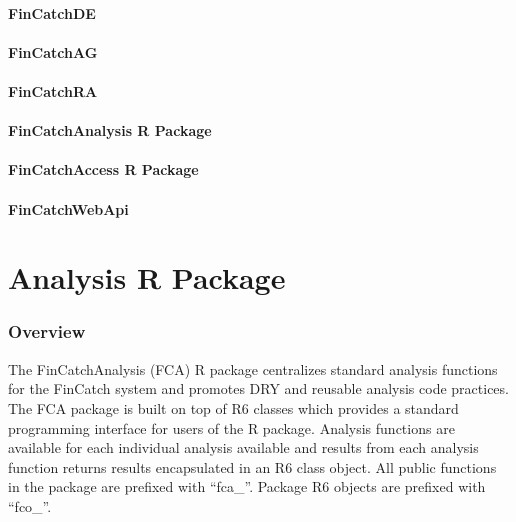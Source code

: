 \documentclass[
  letterpaper,
  DIV=11,
  numbers=noendperiod]{scrreprt}
\begin{document}
\hypertarget{fincatchde}{%
\subsection*{FinCatchDE}\label{fincatchde}}

\hypertarget{fincatchag}{%
\subsection*{FinCatchAG}\label{fincatchag}}

\hypertarget{fincatchra}{%
\subsection*{FinCatchRA}\label{fincatchra}}

\hypertarget{fincatchanalysis-r-package}{%
\subsection*{FinCatchAnalysis R
Package}\label{fincatchanalysis-r-package}}

\hypertarget{fincatchaccess-r-package}{%
\subsection*{FinCatchAccess R Package}\label{fincatchaccess-r-package}}

\hypertarget{fincatchwebapi}{%
\subsection*{FinCatchWebApi}\label{fincatchwebapi}}

\part{Analysis R Package}

\hypertarget{overview}{%
\section*{Overview}\label{overview}}

The FinCatchAnalysis (FCA) R package centralizes standard analysis
functions for the FinCatch system and promotes DRY and reusable analysis
code practices. The FCA package is built on top of R6 classes which
provides a standard programming interface for users of the R package.
Analysis functions are available for each individual analysis available
and results from each analysis function returns results encapsulated in
an R6 class object. All public functions in the package are prefixed
with ``fca\_''. Package R6 objects are prefixed with ``fco\_''.
\end{document}
